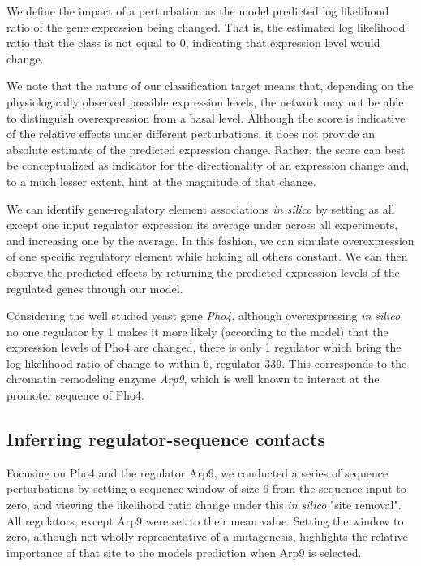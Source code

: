 \documentclass{article}
\begin{document}
We define the impact of a perturbation as the model predicted log likelihood ratio of the gene expression being changed. That is, the estimated log likelihood ratio that the class is not equal to 0, indicating that expression level would change.

We note that the nature of our classification target means that, depending on the physiologically observed possible expression levels, the network may not be able to distinguish overexpression from a basal level. Although the score is indicative of the relative effects under different perturbations, it does not provide an absolute estimate of the predicted expression change. Rather, the score can best be conceptualized as indicator for the directionality of an expression change and, to a much lesser extent, hint at the magnitude of that change.

We can identify gene-regulatory element associations \textit{in silico} by setting as all except one input regulator expression its average under across all experiments, and increasing one by the average. In this fashion, we can simulate overexpression of one specific regulatory element while holding all others constant. We can then observe the predicted effects by returning the predicted expression levels of the regulated genes through our model.

Considering the well studied yeast gene \emph{Pho4}, although overexpressing \textit{in silico} no one regulator by 1 makes it more likely (according to the model) that the expression levels of Pho4 are changed, there is only 1 regulator which bring the log likelihood ratio of change to within 6, regulator 339. This corresponds to the chromatin remodeling enzyme \emph{Arp9}, which is well known to interact at the promoter sequence of Pho4.

\subsection{Inferring regulator-sequence contacts}

Focusing on Pho4 and the regulator Arp9, we conducted a series of sequence perturbations by setting a sequence window of size 6 from the sequence input to zero, and viewing the likelihood ratio change under this \textit{in silico} "site removal". All regulators, except Arp9 were set to their mean value. Setting the window to zero, although not wholly representative of a mutagenesis, highlights the relative importance of that site to the models prediction when Arp9 is selected.
\end{document}
